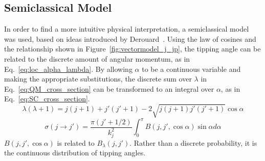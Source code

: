 \documentclass[letterpaper,11pt]{article}
\begin{document}
\subsection{Semiclassical Model}
In order to find a more intuitive physical interpretation, a semiclassical
model was used, based on ideas introduced by Derouard~\cite{Der84}.  Using the
law of cosines and the relationship shown in Figure~\ref{fig:vectormodel_j_jp},
the tipping angle can be related to the discrete amount of angular momentum, as
in Eq.~\ref{eq:loc_alpha_lambda}.  By allowing $\alpha$ to be a continuous
variable and making the appropriate substitutions, the discrete sum over
$\lambda$ in Eq.~\ref{eq:QM_cross_section} can be transformed to an integral
over $\alpha$, as in Eq.~\ref{eq:SC_cross_section}.
\begin{equation}
    \lambda(\lambda+1)=j(j+1)+j'(j'+1)-2\sqrt{j(j+1)j'(j'+1)}\cos\alpha
    \label{eq:loc_alpha_lambda}
\end{equation}
\begin{equation}
    \sigma(j\rightarrow j')=\frac{\pi(j'+1/2)}{k_j^2}{\int_{0}^{\pi}{B(j,j',\cos\alpha)\sin\alpha d\alpha}}
    \label{eq:SC_cross_section}
\end{equation}
$B(j,j',\cos\alpha)$ is related to $B_\lambda(j,j')$.  Rather than a
discrete probability, it is the continuous distribution of tipping angles.
\end{document}
